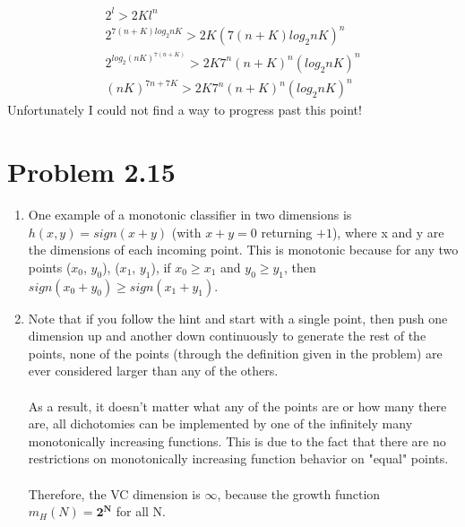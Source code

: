 \documentclass[12pt]{article}
\begin{document}
\begin{enumerate}[label=(\alph*)]
	\begin{gather*}
	2^l > 2Kl^n
	\\ 2^{7(n + K)log_2{nK}} > 2K(7(n+K)log_2{nK})^n
	\\ 2^{log_2{(nK)^{7(n + K)}}} > 2K7^n(n+K)^n(log_2{nK})^n
	\\ (nK)^{7n + 7K} > 2K7^n(n+K)^n(log_2{nK})^n
	\end{gather*}
	Unfortunately I could not find a way to progress past this point!
\end{enumerate}

\section*{Problem 2.15}
\begin{enumerate}[label=(\alph*)]
	\item One example of a monotonic classifier in two dimensions is $h(x, y) = sign(x + y)$ (with $x + y = 0$ returning $+1$), where x and y are the dimensions of each incoming point. This is monotonic because for any two points ($x_0$, $y_0$), ($x_1$, $y_1$), if $x_0 \ge x_1$ and $y_0 \ge y_1$, then $sign(x_0 + y_0) \ge sign(x_1 + y_1)$.
	\item Note that if you follow the hint and start with a single point, then push one dimension up and another down continuously to generate the rest of the points, none of the points (through the definition given in the problem) are ever considered larger than any of the others.
	\\ \\ As a result, it doesn't matter what any of the points are or how many there are, all dichotomies can be implemented by one of the infinitely many monotonically increasing functions. This is due to the fact that there are no restrictions on monotonically increasing function behavior on "equal" points.
	\\ \\ Therefore, the VC dimension is $\boldsymbol{\infty}$, because the growth function $m_H(N) = \boldsymbol{2^N}$ for all N.
\end{enumerate}
\end{document}
